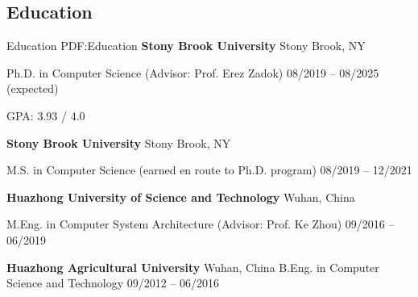 \documentclass[a4paper,10pt,oneside]{article}
\begin{document}
\begin{body}


\section
{Education}
{Education}
{PDF:Education}
{\textbf{Stony Brook University}}
\hfill
Stony Brook, NY

\BulletItem
Ph.D. in
{Computer Science} (Advisor: Prof. Erez Zadok)
\hfill
08/2019 -- 08/2025 (expected)


\begin{detail}
\BulletItem
GPA: 3.93 / 4.0 

\end{detail}

\GapNoBreak

{\textbf{Stony Brook University}}
\hfill
Stony Brook, NY

\GapNoBreak
\BulletItem
M.S. in
{Computer Science} (earned en route to Ph.D. program)
\hfill
08/2019 -- 12/2021
\begin{detail}
\end{detail}

\GapNoBreak

{\textbf{Huazhong University of Science and Technology}}
\hfill
Wuhan, China

\GapNoBreak
\BulletItem
M.Eng. in
{Computer System Architecture} (Advisor: Prof. Ke Zhou)
\hfill
09/2016 -- 06/2019
\begin{detail}
\end{detail}

\GapNoBreak

{\textbf{Huazhong Agricultural University}}
\hfill
Wuhan, China
\GapNoBreak
\BulletItem
B.Eng. in
{Computer Science and Technology}
\hfill
09/2012 -- 06/2016
\begin{detail}
\end{detail}



\end{body}
\end{document}
